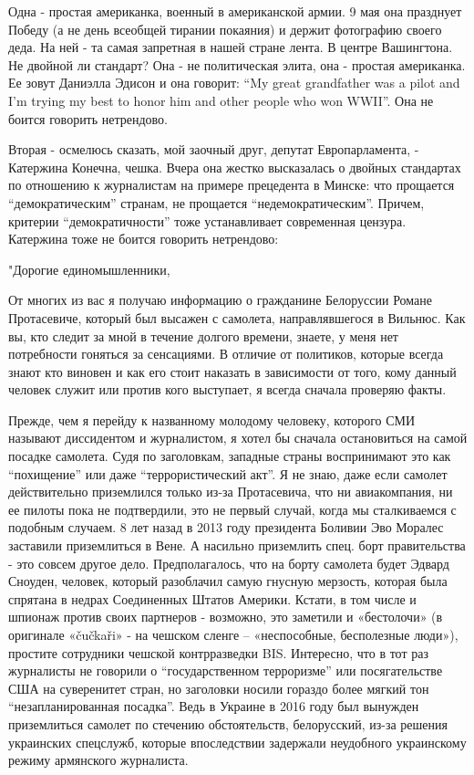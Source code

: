 Одна - простая американка, военный в американской армии. 9 мая она празднует
Победу (а не день всеобщей тирании покаяния) и держит фотографию своего деда.
На ней - та самая запретная в нашей стране лента. В центре Вашингтона. Не
двойной ли стандарт? Она - не политическая элита, она - простая американка. Ее
зовут Даниэлла Эдисон и она говорит: \enquote{My great grandfather was a pilot and I'm
trying my best to honor him and other people who won WWII}. Она не боится
говорить нетрендово.

Вторая - осмелюсь сказать, мой заочный друг, депутат Европарламента, -
Катержина Конечна, чешка. Вчера она жестко высказалась о двойных стандартах по
отношению к журналистам на примере прецедента в Минске: что прощается
\enquote{демократическим} странам, не прощается \enquote{недемократическим}. Причем, критерии
\enquote{демократичности} тоже устанавливает современная цензура. Катержина тоже не
боится говорить нетрендово:

"Дорогие единомышленники,

От многих из вас я получаю информацию о гражданине Белоруссии Романе
Протасевиче, который был высажен с самолета, направлявшегося в Вильнюс. Как вы,
кто следит за мной в течение долгого времени, знаете, у меня нет потребности
гоняться за сенсациями. В отличие от политиков, которые всегда знают кто
виновен и как его стоит наказать в зависимости от того, кому данный человек
служит или против кого выступает, я всегда сначала проверяю факты.

Прежде, чем я перейду к названному молодому человеку, которого СМИ называют
диссидентом и журналистом, я хотел бы сначала остановиться на самой посадке
самолета. Судя по заголовкам, западные страны воспринимают это как \enquote{похищение}
или даже \enquote{террористический акт}. Я не знаю, даже если самолет действительно
приземлился только из-за Протасевича, что ни авиакомпания, ни ее пилоты пока не
подтвердили, это не первый случай, когда мы сталкиваемся с подобным случаем. 8
лет назад в 2013 году президента Боливии Эво Моралес заставили приземлиться в
Вене. А насильно приземлить спец. борт правительства - это совсем другое дело.
Предполагалось, что на борту самолета будет Эдвард Сноуден, человек, который
разоблачил самую гнусную мерзость, которая была спрятана в недрах Соединенных
Штатов Америки. Кстати, в том числе и шпионаж против своих партнеров -
возможно, это заметили и «бестолочи» (в оригинале «čučkaři» - на чешском сленге
– «неспособные, бесполезные люди»), простите сотрудники чешской контрразведки
BIS. Интересно, что в тот раз журналисты не говорили о \enquote{государственном
терроризме} или посягательстве США на суверенитет стран, но заголовки носили
гораздо более мягкий тон \enquote{незапланированная посадка}. Ведь в Украине в 2016
году был вынужден приземлиться самолет по стечению обстоятельств, белорусский,
из-за решения украинских спецслужб, которые впоследствии задержали неудобного
украинскому режиму армянского журналиста.

